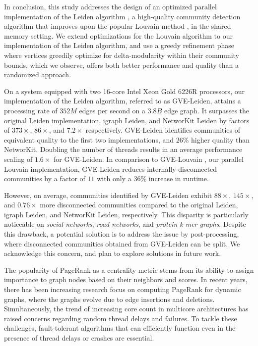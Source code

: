 In conclusion, this study addresses the design of an optimized parallel implementation of the Leiden algorithm \cite{com-traag19}, a high-quality community detection algorithm that improves upon the popular Louvain method \cite{com-blondel08}, in the shared memory setting. We extend optimizations for the Louvain algorithm \cite{sahu2023gvelouvain} to our implementation of the Leiden algorithm, and use a greedy refinement phase where vertices greedily optimize for delta-modularity within their community bounds, which we observe, offers both better performance and quality than a randomized approach.

On a system equipped with two 16-core Intel Xeon Gold 6226R processors, our implementation of the Leiden algorithm, referred to as GVE-Leiden, attains a processing rate of $352 M$ edges per second on a $3.8 B$ edge graph. It surpasses the original Leiden implementation, igraph Leiden, and NetworKit Leiden by factors of $373\times$, $86\times$, and $7.2\times$ respectively. GVE-Leiden identifies communities of equivalent quality to the first two implementations, and $26\%$ higher quality than NetworKit. Doubling the number of threads results in an average performance scaling of $1.6\times$ for GVE-Leiden. In comparison to GVE-Louvain \cite{sahu2023gvelouvain}, our parallel Louvain implementation, GVE-Leiden reduces internally-disconnected communities by a factor of $11$ with only a $36\%$ increase in runtime.

However, on average, communities identified by GVE-Leiden exhibit $88\times$, $145\times$, and $0.76\times$ more disconnected communities compared to the original Leiden, igraph Leiden, and NetworKit Leiden, respectively. This disparity is particularly noticeable on \textit{social networks}, \textit{road networks}, and \textit{protein k-mer graphs}. Despite this drawback, a potential solution is to address the issue by post-processing, where disconnected communities obtained from GVE-Leiden can be split. We acknowledge this concern, and plan to explore solutions in future work.




The popularity of PageRank as a centrality metric stems from its ability to assign importance to graph nodes based on their neighbors and scores. In recent years, there has been increasing research focus on computing PageRank for dynamic graphs, where the graphs evolve due to edge insertions and deletions. Simultaneously, the trend of increasing core count in multicore architectures has raised concerns regarding random thread delays and failures. To tackle these challenges, fault-tolerant algorithms that can efficiently function even in the presence of thread delays or crashes are essential.

